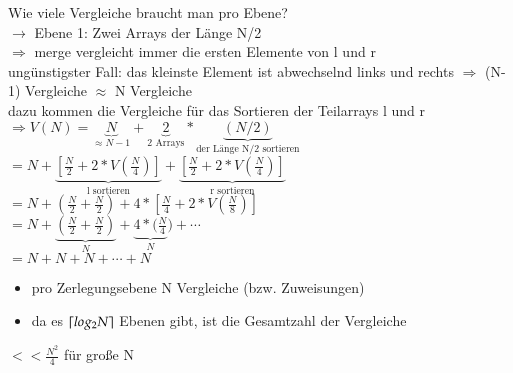         Wie viele Vergleiche braucht man pro Ebene? \\

        \hspace*{5mm} $\rightarrow$ Ebene 1: Zwei Arrays der Länge N/2 \\
        \hspace*{7mm} $\Rightarrow$ merge vergleicht immer die ersten Elemente von l und r \\
        \hspace*{5mm} ungünstigster Fall: das kleinste Element ist abwechselnd links und rechts $\Rightarrow$ (N-1) Vergleiche $\approx$ N Vergleiche \\

        dazu kommen die Vergleiche für das Sortieren der Teilarrays l und r \\

        \hspace*{5mm} $ \Rightarrow  V(N)= \underbrace{N}_{\approx N-1} + \underbrace{2}_{\text{2 Arrays}}* \underbrace{(N/2)}_{\text{der Länge N/2 sortieren}} $ \\

        \hspace*{19.5mm} $= N + \underbrace{[\frac{N}{2} + 2 * V(\frac{N}{4})]}_{\text{l sortieren}} + \underbrace{[\frac{N}{2} + 2 * V(\frac{N}{4})]}_{\text{r sortieren}}$ \\

        \hspace*{19.5mm} $= N + (\frac{N}{2} + \frac{N}{2}) + 4 * [\frac{N}{4} + 2 * V(\frac{N}{8})] $\\

        \hspace*{19.5mm} $= N + \underbrace{(\frac{N}{2} + \frac{N}{2})}_{N} + \underbrace{4 * (\frac{N}{4}}_{N}) + \cdots $\\

        \hspace*{19.5mm} $= N + N + N + \cdots + N$

        \begin{itemize}[label={$\Rightarrow$}]
            \item pro Zerlegungsebene N Vergleiche (bzw. Zuweisungen)
            \item da es $\lceil log_2 N\rceil$ Ebenen gibt, ist die Gesamtzahl der Vergleiche
        \end{itemize}

        \hspace*{5mm}  $<< \frac{N^2}{4}$ für große N \\


